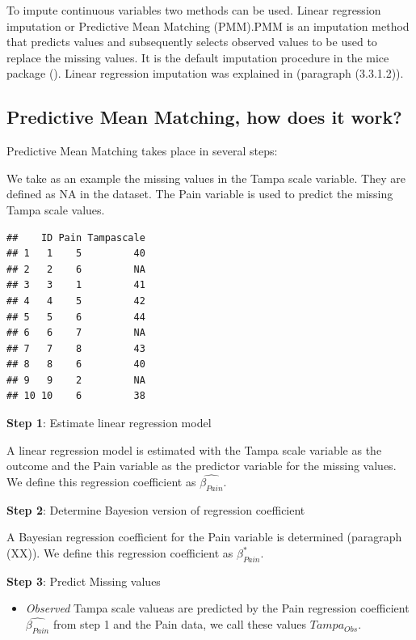 \documentclass[]{book}
\providecommand{\tightlist}{%
  \setlength{\itemsep}{0pt}\setlength{\parskip}{0pt}}
\begin{document}
To impute continuous variables two methods can be used. Linear
regression imputation or Predictive Mean Matching (PMM).PMM is an
imputation method that predicts values and subsequently selects observed
values to be used to replace the missing values. It is the default
imputation procedure in the mice package (\citet{rubin1987}). Linear
regression imputation was explained in (paragraph (3.3.1.2)).

\subsection{Predictive Mean Matching, how does it
work?}\label{predictive-mean-matching-how-does-it-work}

Predictive Mean Matching takes place in several steps:

We take as an example the missing values in the Tampa scale variable.
They are defined as NA in the dataset. The Pain variable is used to
predict the missing Tampa scale values.

\begin{verbatim}
##    ID Pain Tampascale
## 1   1    5         40
## 2   2    6         NA
## 3   3    1         41
## 4   4    5         42
## 5   5    6         44
## 6   6    7         NA
## 7   7    8         43
## 8   8    6         40
## 9   9    2         NA
## 10 10    6         38
\end{verbatim}

\textbf{Step 1}: Estimate linear regression model

A linear regression model is estimated with the Tampa scale variable as
the outcome and the Pain variable as the predictor variable for the
missing values. We define this regression coefficient as
\(\hat{\beta_{Pain}}\).

\textbf{Step 2}: Determine Bayesion version of regression coefficient

A Bayesian regression coefficient for the Pain variable is determined
(paragraph (XX)). We define this regression coefficient as
\(\beta_{Pain}^*\).

\textbf{Step 3}: Predict Missing values

\begin{itemize}
\tightlist
\item
  \emph{Observed} Tampa scale valueas are predicted by the Pain
  regression coefficient \(\hat{\beta_{Pain}}\) from step 1 and the Pain
  data, we call these values \(Tampa_{Obs}\).
\end{itemize}
\end{document}
